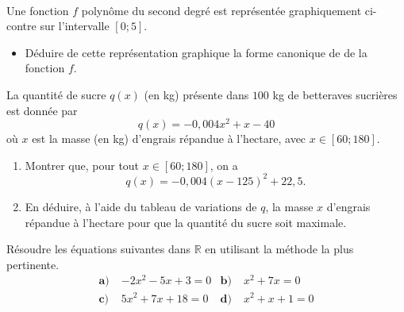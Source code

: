 \documentclass[11pt]{article}
\begin{document}
\begin{exo}~\\[-10mm]
  \begin{minipage}{.47\textwidth}
  Une fonction $f$ polynôme du second degré est représentée graphiquement
  ci-contre sur l'intervalle $[0; 5]$.
  \begin{itemize}
    \item Déduire de cette représentation graphique la forme canonique de de la
      fonction $f$.
  \end{itemize}
\end{minipage}
\begin{minipage}{.47\textwidth}
  \begin{center}
\end{center}
\end{minipage}
\end{exo}

\begin{exo}
  La quantité de sucre $q(x)$ (en kg) présente dans $100$ kg de betteraves
  sucrières est donnée par
  \[
    q(x) = -0,004x^2+x-40
  \]
  où $x$ est la masse (en kg) d'engrais répandue à l'hectare, avec $x\in[60;
  180]$.
  \begin{enumerate}
    \item Montrer que, pour tout $x\in[60; 180]$, on a
      \[
        q(x) = -0,004(x-125)^2+22,5.
      \]
    \item En déduire, à l'aide du tableau de variations de $q$, la masse $x$
      d'engrais répandue à l'hectare pour que la quantité du sucre soit
      maximale.
  \end{enumerate}
\end{exo}

\begin{exo}
  Résoudre les équations suivantes dans $\mathbb{R}$ en utilisant la méthode la
  plus pertinente.
  \begin{align*}
    \textbf{a)}\;& -2x^2 - 5x +3 = 0 &
    \textbf{b)}\;& x^2 + 7x = 0 \\
    \textbf{c)}\;& 5x^2 + 7x +18 = 0 &
    \textbf{d)}\;& x^2 +x +1 = 0
  \end{align*}
\end{exo}
\end{document}
